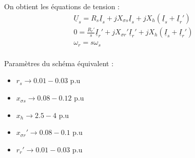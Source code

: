 \documentclass[../main.tex]{subfiles}
\begin{document}
On obtient les équations de tension : \begin{equation}
    \begin{gathered}
        \underline{U}_s = R_s \underline{I}_s + j X_{\sigma s} \underline{I}_s + jX_h (\underline{I}_s + \underline{I}_r' )\\
        0 = \frac{R_r'}{s} \underline{I}_r' + jX_{\sigma r}' \underline{I}_r' + jX_h(\underline{I}_s + \underline{I}_r')\\
        \omega_r = s\omega_s\\
    \end{gathered}
\end{equation}

Paramètres du schéma équivalent : \begin{itemize}
    \item $r_s \rightarrow 0.01-0.03$ p.u\\
    \item $x_{\sigma s} \rightarrow 0.08-0.12$ p.u\\
    \item $x_h \rightarrow 2.5-4$ p.u\\
    \item $x_{\sigma r}' \rightarrow 0.08-0.1$ p.u\\
    \item $r_r' \rightarrow 0.01-0.03$ p.u\\
\end{itemize}
\end{document}

